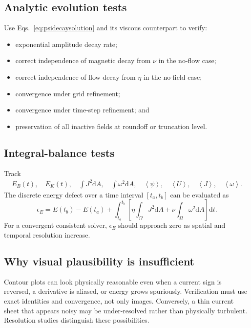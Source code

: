 \documentclass[11pt]{article}
\newcommand{\dd}{\mathrm{d}}
\newcommand{\average}[1]{\left\langle #1\right\rangle}
\begin{document}
\subsection{Analytic evolution tests}

Use Eqs.~\eqref{eq:psidecaysolution} and its viscous counterpart to verify:
\begin{itemize}
  \item exponential amplitude decay rate;
  \item correct independence of magnetic decay from $\nu$ in the no-flow case;
  \item correct independence of flow decay from $\eta$ in the no-field case;
  \item convergence under grid refinement;
  \item convergence under time-step refinement; and
  \item preservation of all inactive fields at roundoff or truncation level.
\end{itemize}

\subsection{Integral-balance tests}

Track
\begin{align}
E_B(t),\quad E_K(t),\quad
\int J^2\dd A,\quad\int\omega^2\dd A,
\quad\average{\psi},\quad\average{U},
\quad\average{J},\quad\average{\omega}.
\end{align}
The discrete energy defect over a time interval $[t_a,t_b]$ can be evaluated as
\begin{equation}
\epsilon_E
=E(t_b)-E(t_a)
+\int_{t_a}^{t_b}\left[
\eta\int_\Omega J^2\dd A
+\nu\int_\Omega\omega^2\dd A
\right]\dd t.
\end{equation}
For a convergent consistent solver, $\epsilon_E$ should approach zero as spatial and temporal resolution increase.

\subsection{Why visual plausibility is insufficient}

Contour plots can look physically reasonable even when a current sign is reversed, a derivative is aliased, or energy grows spuriously. Verification must use exact identities and convergence, not only images. Conversely, a thin current sheet that appears noisy may be under-resolved rather than physically turbulent. Resolution studies distinguish these possibilities.
\end{document}

